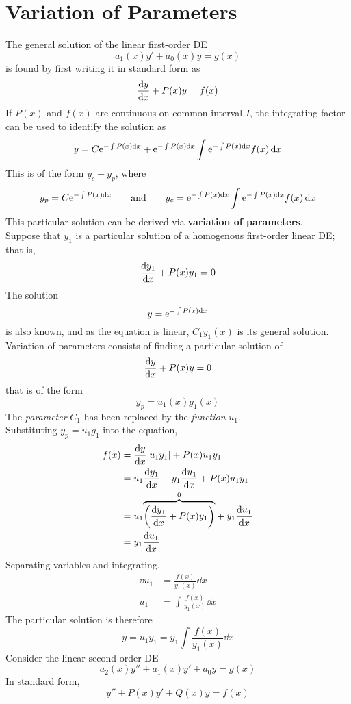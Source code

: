 \documentclass[./Differential Equations]{subfiles}
\begin{document}
	\section{Variation of Parameters}
			The general solution of the linear first-order DE
				\[a_1(x)y' + a_0(x)y = g(x)\]
				is found by first writing it in standard form as
				\[\dv{y}{x} + P(x)y = f(x)\]
				If \(P(x)\) and \(f(x)\) are continuous on common interval \(I\), the integrating factor can be used to identify the solution as
				\[y = C\text{e}^{-\int P(x) \dd{x}} + \text{e}^{-\int P(x) \dd{x}}\int \text{e}^{-\int P(x) \dd{x}}f(x) \dd{x}\]
				This is of the form \(y_c + y_p\), where
				\[
					y_p = C\text{e}^{-\int P(x)\dd{x}} \qquad \text{and} \qquad
						y_c = \text{e}^{-\int P(x)\dd{x}}\int\text{e}^{-\int P(x) \dd{x}}f(x) \dd{x}
				\]
				This particular solution can be derived via \textbf{variation of parameters}. \\
			Suppose that \(y_1\) is a particular solution of a homogenous first-order linear DE; that is,
				\[\dv{y_1}{x} + P(x)y_1 = 0\]
				The solution
				\[y = \text{e}^{-\int P(x) \dd{x}}\]
				is also known, and as the equation is linear, \(C_1y_1(x)\) is its general solution. Variation of parameters consists of finding a particular solution of				
				\[\dv{y}{x} + P(x)y = 0\]
				that is of the form
				\[y_p = u_1(x)g_1(x)\]
				The \textit{parameter} \(C_1\) has been replaced by the \textit{function} \(u_1\). \\
				Substituting \(y_p = u_1g_1\) into the equation,
				\begin{align*}
					f(x) &= \dv{y}{x}[u_1y_1] + P(x)u_1y_1 \\
						&= u_1\dv{y_1}{x} + y_1\dv{u_1}{x} + P(x)u_1y_1 \\
						&= u_1\overset{0}{\overbrace{\left(\dv{y_1}{x} + P(x)y_1\right)}} + y_1\dv{u_1}{x} \\
						&= y_1\dv{u_1}{x}
				\end{align*}
				Separating variables and integrating,
				\begin{align*}
					\dd{u_1} &= \frac{f(x)}{y_1(x)} \dd{x} \\
					u_1 &= \int \frac{f(x)}{y_1(x)} \dd{x}
				\end{align*}
				The particular solution is therefore
				\[y = u_1y_1 = y_1\int \frac{f(x)}{y_1(x)} \dd{x}\]
			Consider the linear second-order DE
				\[a_2(x)y'' + a_1(x)y' + a_0y = g(x)\]
				In standard form,
				\[y'' + P(x)y' + Q(x)y = f(x)\]
\end{document}
